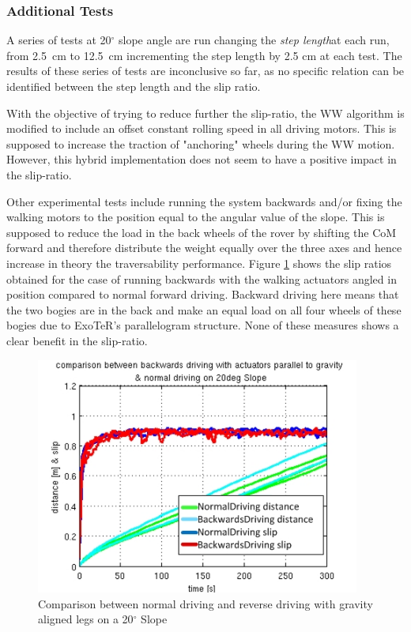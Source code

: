\documentclass[a4paper,twocolumn]{esapub2005} %
\begin{document}
\subsubsection*{Additional Tests}
A series of tests at 20$^{\circ}$ slope angle are run changing the \textit{step length}\footnotemark[4]
at each run, from 2.5~\unit{cm} to 12.5~\unit{cm} incrementing the step length by 2.5 cm at
each test. The results of these series of tests are inconclusive so far, as no
specific relation can be identified between the step length and the slip ratio.

With the objective of trying to reduce further the slip-ratio, the WW algorithm
is modified to include an offset constant rolling speed in all driving motors.
This is supposed to increase the traction of "anchoring" wheels during the WW
motion. However, this hybrid implementation does not seem to have a positive
impact in the slip-ratio.

Other experimental tests include running the system backwards and/or fixing the
walking motors to the position equal to the angular value of the slope. This is
supposed to reduce the load in the back wheels of the rover by shifting the CoM
forward and therefore distribute the weight equally over the three axes and
hence increase in theory the traversability performance. Figure
\ref{fig:ndr20d} shows the slip ratios obtained for the case of running
backwards with the walking actuators angled in position compared to normal
forward driving. Backward driving here means that the two bogies are in the
back and make an equal load on all four wheels of these bogies due to ExoTeR's
parallelogram structure. None of these measures shows a clear benefit in the slip-ratio.

\begin{figure}[h!]
    \centering
    \includegraphics[width=0.95\textwidth]{ndr20dega2.jpg}	\caption{Comparison between
    normal driving and reverse driving with gravity aligned legs on a 20$^{\circ}$ Slope}
    \label{fig:ndr20d}
\end{figure}
\end{document}
